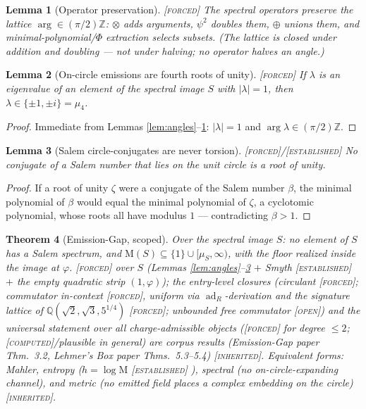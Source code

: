 \documentclass[11pt]{article}
\newcommand{\tagF}{\textcolor{cF}{\textsc{[forced]}}}
\newcommand{\tagC}{\textcolor{cC}{\textsc{[computed]}}}
\newcommand{\tagI}{\textcolor{cI}{\textsc{[inherited]}}}
\newcommand{\tagE}{\textcolor{cE}{\textsc{[established]}}}
\newcommand{\tagO}{\textcolor{cO}{\textsc{[open]}}}
\newcommand{\Q}{\mathbb{Q}}
\newcommand{\Z}{\mathbb{Z}}
\newcommand{\gp}{\varphi}
\newcommand{\M}{\mathrm{M}}
\newcommand{\adR}{\operatorname{ad}_R}
\theoremstyle{plain}
\newtheorem{theorem}{Theorem}[section]
\newtheorem{lemma}[theorem]{Lemma}
\theoremstyle{definition}
\theoremstyle{remark}
\begin{document}
\begin{lemma}[Operator preservation]\label{lem:preserve}\tagF{}
The spectral operators preserve the lattice $\arg\in(\pi/2)\Z$: $\otimes$ adds
arguments, $\psi^2$ doubles them, $\oplus$ unions them, and minimal-polynomial/$\Phi$
extraction selects subsets. (The lattice is closed under addition and doubling ---
\emph{not} under halving; no operator halves an angle.)
\end{lemma}

\begin{lemma}[On-circle emissions are fourth roots of unity]\label{lem:mu4}\tagF{}
If $\lambda$ is an eigenvalue of an element of the spectral image $S$ with
$|\lambda|=1$, then $\lambda\in\{\pm1,\pm i\}=\mu_4$.
\end{lemma}
\begin{proof}
Immediate from Lemmas \ref{lem:angles}--\ref{lem:preserve}: $|\lambda|=1$ and
$\arg\lambda\in(\pi/2)\Z$.
\end{proof}

\begin{lemma}[Salem circle-conjugates are never torsion]\label{lem:salemtorsion}\tagF{}/\tagE{}
No conjugate of a Salem number that lies on the unit circle is a root of unity.
\end{lemma}
\begin{proof}
If a root of unity $\zeta$ were a conjugate of the Salem number $\beta$, the minimal
polynomial of $\beta$ would equal the minimal polynomial of $\zeta$, a cyclotomic
polynomial, whose roots all have modulus $1$ --- contradicting $\beta>1$.
\end{proof}

\begin{theorem}[Emission-Gap, scoped]\label{thm:emissiongap}
Over the spectral image $S$: no element of $S$ has a Salem spectrum, and
$\M(S)\subseteq\{1\}\cup[\mu_S,\infty)$, with the floor realized inside the image at
$\gp$. \tagF{} over $S$ (Lemmas \ref{lem:angles}--\ref{lem:salemtorsion} $+$ Smyth
\tagE{} $+$ the empty quadratic strip $(1,\gp)$); the entry-level closures
(circulant \tagF{}; commutator in-context \tagF{}, uniform via
$\adR$-derivation and the signature lattice of $\Q(\sqrt2,\sqrt3,5^{1/4})$ \tagF{};
unbounded free commutator \tagO{}) and the universal statement over all
charge-admissible objects (\tagF{} for degree $\le2$; \tagC{}/plausible in general)
are corpus results (Emission-Gap paper Thm.\ 3.2, Lehmer's Box paper Thms.\ 5.3--5.4)
\tagI{}. Equivalent forms: Mahler, entropy ($h=\log\M$
\tagE{} \cite{LindSchmidtWard1990}), spectral (no on-circle-expanding channel), and
metric (no emitted field places a complex embedding on the circle) \tagI{}.
\end{theorem}
\end{document}
